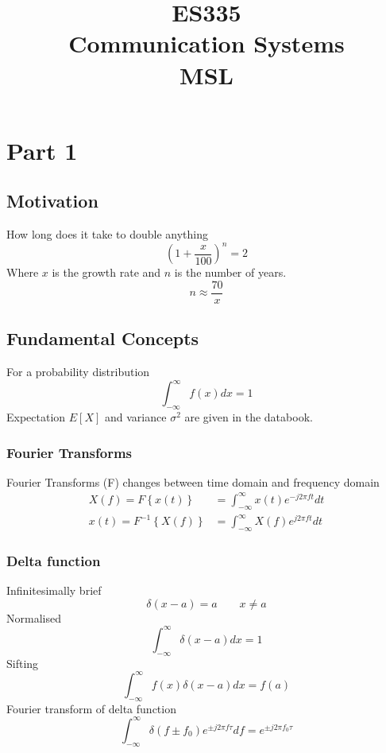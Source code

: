 \documentclass[a4paper,twocolumn]{article}
\title{ES335 \\ Communication Systems \\ MSL}
\newcommand{\infint}{ \int_{-\infty}^{\infty}}
\begin{document}
	\section{Part 1}
		\subsection{Motivation}
			How long does it take to double anything
			\begin{equation}
				\left( 1+\frac{x}{100}\right)^n = 2
			\end{equation}
			Where $x$ is the growth rate and $n$ is the number of years.
			\begin{equation}
				n \approx \frac{70}{x}
			\end{equation}

		\subsection{Fundamental Concepts}
			For a probability distribution
			\begin{equation}
				\infint f(x) dx =1
			\end{equation}
			Expectation $E[X]$ and variance $\sigma^2$ are given in the databook.

			\subsubsection{Fourier Transforms}
				Fourier Transforms (F) changes between time domain and frequency domain
				\begin{align}
					X(f)= F \left\{ x(t) \right\} & = \infint x(t)e^{-j 2 \pi f t} dt\\
					x(t) = F ^{-1}\left\{ X(f) \right\} & = \infint X(f)e^{j 2 \pi f t} dt
				\end{align}

			\subsubsection{Delta function}
				Infinitesimally brief
				\begin{equation}
					\delta (x-a)=a \qquad x\ne a
				\end{equation}
				Normalised
				\begin{equation}
					\infint 	\delta (x-a) dx = 1
				\end{equation}
				Sifting
				\begin{equation}
					\infint f(x) \delta(x-a)dx =f(a)
				\end{equation}
				Fourier transform of delta function
				\begin{equation}
					\infint \delta (f \pm f_0) e^{\pm j 2 \pi f \tau} df = e^{\pm j 2 \pi f_0 \tau}
				\end{equation}
\end{document}
